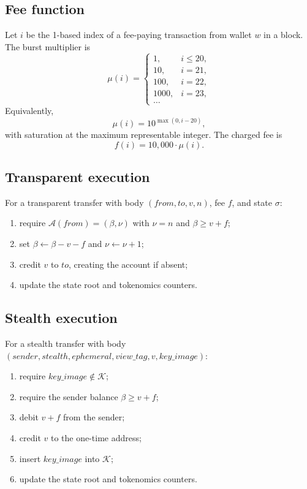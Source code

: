 \documentclass[11pt,a4paper]{article}
\theoremstyle{definition}
\theoremstyle{plain}
\begin{document}
\subsection{Fee function}

Let $i$ be the 1-based index of a fee-paying transaction from wallet $w$ in a
block. The burst multiplier is
\[
  \mu(i)=
  \begin{cases}
    1, & i\le 20,\\
    10, & i=21,\\
    100, & i=22,\\
    1000, & i=23,\\
    \dots
  \end{cases}
\]
Equivalently,
\[
  \mu(i)=10^{\max(0,i-20)},
\]
with saturation at the maximum representable integer. The charged fee is
\[
  f(i)=10{,}000\cdot\mu(i).
\]

\subsection{Transparent execution}

For a transparent transfer with body $(from,to,v,n)$, fee $f$, and state
$\sigma$:
\begin{enumerate}[leftmargin=*]
  \item require $\mathcal{A}(from)=(\beta,\nu)$ with $\nu=n$ and
        $\beta\ge v+f$;
  \item set $\beta\leftarrow\beta-v-f$ and $\nu\leftarrow\nu+1$;
  \item credit $v$ to $to$, creating the account if absent;
  \item update the state root and tokenomics counters.
\end{enumerate}

\subsection{Stealth execution}

For a stealth transfer with body
$(sender,stealth,ephemeral,view\_tag,v,key\_image)$:
\begin{enumerate}[leftmargin=*]
  \item require $key\_image\notin\mathcal{K}$;
  \item require the sender balance $\beta\ge v+f$;
  \item debit $v+f$ from the sender;
  \item credit $v$ to the one-time address;
  \item insert $key\_image$ into $\mathcal{K}$;
  \item update the state root and tokenomics counters.
\end{enumerate}
\end{document}
